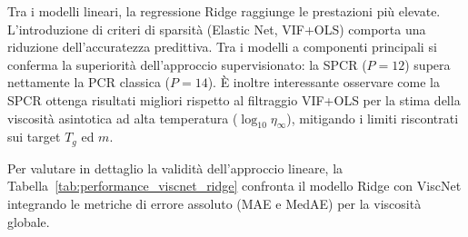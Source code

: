 \documentclass[../main.tex]{subfiles}
\begin{document}
	\begin{table}[h!]
		\centering
		\caption{Riassunto delle performance predittive valutate sull'\textit{unseen test set} per la stima della viscosità globale e dei singoli parametri di MYEGA.}
		\label{tab:performance_all}
	\end{table}
	
	Tra i modelli lineari, la regressione Ridge raggiunge le prestazioni più elevate. L'introduzione di criteri di sparsità (Elastic Net, VIF+OLS) comporta una riduzione dell'accuratezza predittiva. Tra i modelli a componenti principali si conferma la superiorità dell'approccio supervisionato: la SPCR ($P=12$) supera nettamente la PCR classica ($P=14$). È inoltre interessante osservare come la SPCR ottenga risultati migliori rispetto al filtraggio VIF+OLS per la stima della viscosità asintotica ad alta temperatura ($\log_{10}\eta_\infty$), mitigando i limiti riscontrati sui target $T_g$ ed $m$.
	
	Per valutare in dettaglio la validità dell'approccio lineare, la Tabella~\ref{tab:performance_viscnet_ridge} confronta il modello Ridge con ViscNet integrando le metriche di errore assoluto (MAE e MedAE) per la viscosità globale.
	
\end{document}
